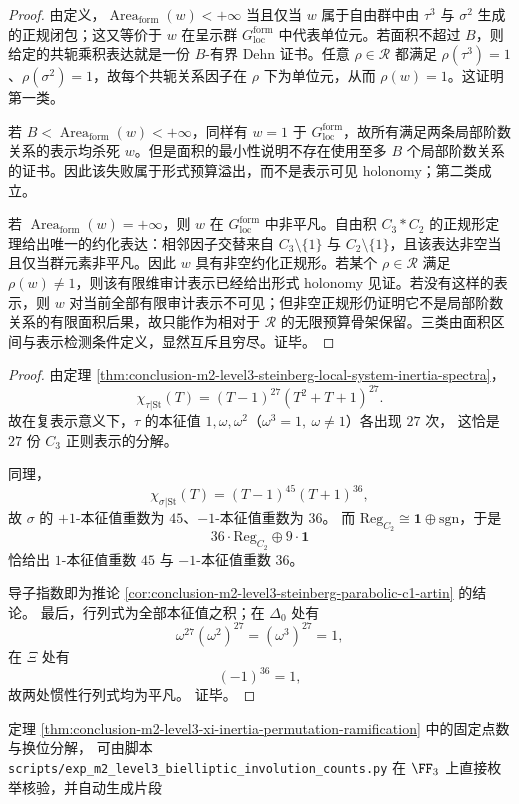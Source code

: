 \begin{proof}
由定义，\(\operatorname{Area}_{\mathrm{form}}(w)<+\infty\) 当且仅当 \(w\) 属于自由群中由 \(\tau^3\) 与 \(\sigma^2\) 生成的正规闭包；这又等价于 \(w\) 在呈示群 \(G_{\mathrm{loc}}^{\mathrm{form}}\) 中代表单位元。若面积不超过 \(B\)，则给定的共轭乘积表达就是一份 \(B\)-有界 Dehn 证书。任意 \(\rho\in\mathscr R\) 都满足 \(\rho(\tau^3)=1\)、\(\rho(\sigma^2)=1\)，故每个共轭关系因子在 \(\rho\) 下为单位元，从而 \(\rho(w)=1\)。这证明第一类。

若 \(B<\operatorname{Area}_{\mathrm{form}}(w)<+\infty\)，同样有 \(w=1\) 于 \(G_{\mathrm{loc}}^{\mathrm{form}}\)，故所有满足两条局部阶数关系的表示均杀死 \(w\)。但是面积的最小性说明不存在使用至多 \(B\) 个局部阶数关系的证书。因此该失败属于形式预算溢出，而不是表示可见 holonomy；第二类成立。

若 \(\operatorname{Area}_{\mathrm{form}}(w)=+\infty\)，则 \(w\) 在 \(G_{\mathrm{loc}}^{\mathrm{form}}\) 中非平凡。自由积 \(C_3\ast C_2\) 的正规形定理给出唯一的约化表达：相邻因子交替来自 \(C_3\setminus\{1\}\) 与 \(C_2\setminus\{1\}\)，且该表达非空当且仅当群元素非平凡。因此 \(w\) 具有非空约化正规形。若某个 \(\rho\in\mathscr R\) 满足 \(\rho(w)\ne1\)，则该有限维审计表示已经给出形式 holonomy 见证。若没有这样的表示，则 \(w\) 对当前全部有限审计表示不可见；但非空正规形仍证明它不是局部阶数关系的有限面积后果，故只能作为相对于 \(\mathscr R\) 的无限预算骨架保留。三类由面积区间与表示检测条件定义，显然互斥且穷尽。证毕。
\end{proof}

\begin{proof}
由定理 \ref{thm:conclusion-m2-level3-steinberg-local-system-inertia-spectra}，
\[
\chi_{\tau|\mathrm{St}}(T)=(T-1)^{27}(T^2+T+1)^{27}.
\]
故在复表示意义下，\(\tau\) 的本征值 \(1,\omega,\omega^2\)（\(\omega^3=1,\ \omega\neq 1\)）各出现 \(27\) 次，
这恰是 \(27\) 份 \(C_3\) 正则表示的分解。

同理，
\[
\chi_{\sigma|\mathrm{St}}(T)=(T-1)^{45}(T+1)^{36},
\]
故 \(\sigma\) 的 \(+1\)-本征值重数为 \(45\)、\(-1\)-本征值重数为 \(36\)。
而 \(\mathrm{Reg}_{C_2}\cong \mathbf 1\oplus \mathrm{sgn}\)，于是
\[
36\cdot \mathrm{Reg}_{C_2}\oplus 9\cdot \mathbf 1
\]
恰给出 \(1\)-本征值重数 \(45\) 与 \(-1\)-本征值重数 \(36\)。

导子指数即为推论 \ref{cor:conclusion-m2-level3-steinberg-parabolic-c1-artin} 的结论。
最后，行列式为全部本征值之积；在 \(\Delta_0\) 处有
\[
\omega^{27}(\omega^2)^{27}=(\omega^3)^{27}=1,
\]
在 \(\Xi\) 处有
\[
(-1)^{36}=1,
\]
故两处惯性行列式均为平凡。
证毕。
\end{proof}

\begin{remark}[有限组合核验脚本]\label{rem:conclusion-m2-level3-xi-involution-audit-script}
定理 \ref{thm:conclusion-m2-level3-xi-inertia-permutation-ramification} 中的固定点数与换位分解，
可由脚本 \texttt{scripts/exp\_m2\_level3\_bielliptic\_involution\_counts.py} 在 \(\FF_3\) 上直接枚举核验，并自动生成片段

\end{remark}
